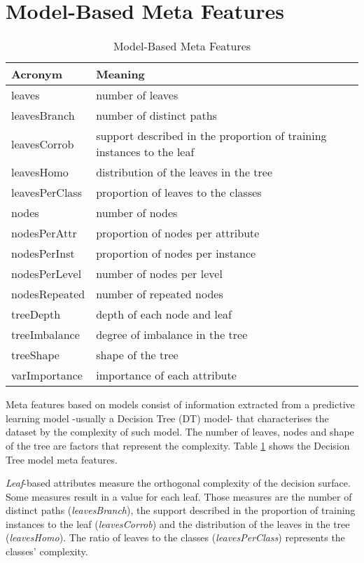 \section{Model-Based Meta Features}
\begin{table}[h!]
\centering
\caption{Model-Based Meta Features}
	\setlength{\tabcolsep}{8pt}
	\renewcommand{\arraystretch}{1.2}
    \begin{tabular}{ll}
    \hline
    Acronym & Meaning \\ \hline
    leaves & number of leaves\\
    leavesBranch & number of distinct paths \\
    leavesCorrob & support described in the proportion of training instances to the leaf\\
    leavesHomo & distribution of the leaves in the tree\\
    leavesPerClass & proportion of leaves to the classes\\
    nodes & number of nodes\\
    nodesPerAttr & proportion of nodes per attribute\\
    nodesPerInst & proportion of nodes per instance\\
    nodesPerLevel & number of nodes per level\\
    nodesRepeated & number of repeated nodes\\
    treeDepth & depth of each node and leaf\\
    treeImbalance & degree of imbalance in the tree\\
    treeShape & shape of the tree\\
    varImportance & importance of each attribute\\
    \hline
    \end{tabular}
\label{tab:model-based-mf}
\end{table}
Meta features based on models consist of information extracted from a predictive learning model -usually a Decision Tree (DT) model- that characterises the dataset by the complexity of such model. The number of leaves, nodes and shape of the tree are factors that represent the complexity. Table \ref{tab:model-based-mf} shows the Decision Tree model meta features.

\textit{Leaf}-based attributes measure the orthogonal complexity of the decision surface. Some measures result in a value for each leaf. Those measures are the number of distinct paths (\textit{leavesBranch}), the support described in the proportion of training instances to the leaf (\textit{leavesCorrob}) and the distribution of the leaves in the tree (\textit{leavesHomo}). The ratio of leaves to the classes (\textit{leavesPerClass}) represents the classes' complexity.

